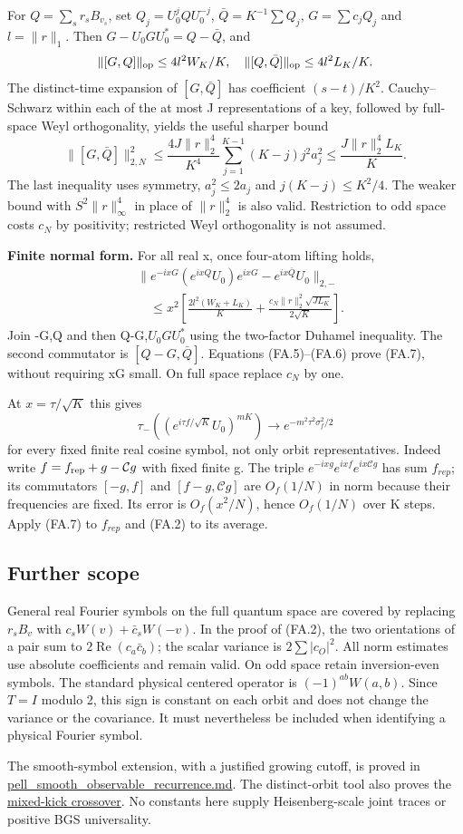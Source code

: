 For \(Q=\sum_s r_s B_{v_s}\), set \(Q_j=U_0^jQU_0^{-j}\), \(\bar Q=K^{-1}\sum Q_j\), \(G=\sum c_jQ_j\) and \(l=\|r\|_1\). Then \(G-U_0GU_0^*=Q-\bar Q\), and \[
 \|[G,Q]\|_{\rm op}\leq4l^2W_K/K,\quad \|[Q,\bar Q]\|_{\rm op}\leq4l^2L_K/K.
\] The distinct-time expansion of \([G,\bar Q]\) has coefficient \((s-t)/K^2\). Cauchy--Schwarz within each of the at most J representations of a key, followed by full-space Weyl orthogonality, yields the useful sharper bound \[
 \|[G,\bar Q]\|_{2,N}^2\leq\frac{4J\|r\|_2^4}{K^4}\sum_{j=1}^{K-1}(K-j)j^2a_j^2\leq\frac{J\|r\|_2^4L_K}{K}. \tag{FA.6}
\] The last inequality uses symmetry, \(a_j^2\leq2a_j\) and \(j(K-j)\leq K^2/4\). The weaker bound with \(S^2\|r\|_\infty^4\) in place of \(\|r\|_2^4\) is also valid. Restriction to odd space costs \(c_N\) by positivity; restricted Weyl orthogonality is not assumed.

\textbf{Finite normal form.} For all real x, once four-atom lifting holds, \[
 \begin{split}
 &\|e^{-ixG}(e^{ixQ}U_0)e^{ixG}-e^{ix\bar Q}U_0\|_{2,-}\\
 &\quad\leq x^2\left[\frac{2l^2(W_K+L_K)}K+\frac{c_N\|r\|_2^2\sqrt{JL_K}}{2\sqrt K}\right].
 \end{split} \tag{FA.7}
\] Join -G,Q and then Q-G,\(U_0GU_0^*\) using the two-factor Duhamel inequality. The second commutator is \([Q-G,\bar Q]\). Equations (FA.5)--(FA.6) prove (FA.7), without requiring xG small. On full space replace \(c_N\) by one.

At \(x=\tau/\sqrt K\) this gives \[
 \tau_-((e^{i\tau f/\sqrt K}U_0)^{mK})\longrightarrow e^{-m^2\tau^2\sigma_f^2/2} \tag{FA.8}
\] for every fixed finite real cosine symbol, not only orbit representatives. Indeed write \(f=f_{\rm rep}+g-\mathcal Cg\) with fixed finite g. The triple \(e^{-ixg}e^{ixf}e^{ix\mathcal Cg}\) has sum \(f_{rep}\); its commutators \([-g,f]\) and \([f-g,\mathcal Cg]\) are \(O_f(1/N)\) in norm because their frequencies are fixed. Its error is \(O_f(x^2/N)\), hence \(O_f(1/N)\) over K steps. Apply (FA.7) to \(f_{rep}\) and (FA.2) to its average.

\subsection{Further scope}\label{finite_fourier:further-scope}

General real Fourier symbols on the full quantum space are covered by replacing \(r_sB_v\) with \(c_sW(v)+\bar c_sW(-v)\). In the proof of (FA.2), the two orientations of a pair sum to \(2\operatorname{Re}(c_a\bar c_b)\); the scalar variance is \(2\sum|c_O|^2\). All norm estimates use absolute coefficients and remain valid. On odd space retain inversion-even symbols. The standard physical centered operator is \((-1)^{ab}W(a,b)\). Since \(T=I\) modulo 2, this sign is constant on each orbit and does not change the variance or the covariance. It must nevertheless be included when identifying a physical Fourier symbol.

The smooth-symbol extension, with a justified growing cutoff, is proved in \url{pell_smooth_observable_recurrence.md}. The distinct-orbit tool also proves the \hyperref[sec:mixed]{mixed-kick crossover}. No constants here supply Heisenberg-scale joint traces or positive BGS universality.
